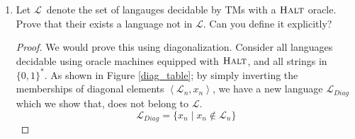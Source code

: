 \documentclass[usletter]{article}
\newcommand {\langset}[1]      {\ensuremath{\mathcal{#1}}}
\newcommand {\machine}[1]      {\ensuremath{\mathscr{#1}}}
\newcommand {\namedlangset}[1] {\ensuremath{\textnormal{\textsc{#1}}}}
\newcommand {\indpar}[1]   {
  \par\leftskip=#1em
  \noindent\ignorespaces
}
\newenvironment{turing}[2] {
  \smallskip
  \indpar{2}
  \textbf{Machine:} #1\\
  \textbf{Input:} $#2$\\[5pt]
  \textbf{begin}
  \parskip=0pt
  \indpar{3}
}{
  \indpar{2}
  \textbf{end}
  \par\medskip
}
\newcommand {\langL}          {\langset{L}}
\newcommand {\machineM}       {\machine{M}}
\begin{document}
\begin{enumerate}
\begin{proof}[Solution]
    By construction, the following observations are immediate:
    \begin{itemize}
      \item $\machine{H}^\alpha_x(k)$ \textit{always} halts; for all inputs $k$
            and regardless of $\alpha$ and $x$.
      \item If $\machineM_\alpha$ \textit{never} halts on $x$;
            then $\machine{H}^\alpha_x(k)$ runs in linear time, for all $k$.
      \item If $\machineM_\alpha$ eventually halts on $x$;
            then $\exists l_0 : \forall k : \machine{H}^\alpha_x(k)$ halts in
            at most $l_0$ steps.
    \end{itemize}

    Now, consider the following TM which should decide \namedlangset{Halt},
    assuming the existence of $\machineM_\namedlangset{Const}$ which decides if
    a TM (that always halts), runs in constant time:
    \begin{turing}{$\machineM_\namedlangset{Halt}$}{(\alpha, x)}
      construct the machine $\machine{H}^\alpha_x$ and encode it as $\beta$\\
      return the result of $\machineM_\namedlangset{Const}(\beta)$
    \end{turing}

    Thus, we have decided \namedlangset{Halt} assuming the decidability of
    \namedlangset{Const}. \\
    But we know \namedlangset{Halt} is undecidable.
    Therefore, \namedlangset{Const} \textit{must be} undecidable as well.
  \end{proof}

  \item Let \langL\ denote the set of langauges decidable by TMs with a
        \namedlangset{Halt} oracle.
        Prove that their exists a language not in \langL.
        Can you define it explicitly?
  \begin{proof}
    We would prove this using diagonalization. Consider all languages decidable
    using oracle machines equipped with \namedlangset{Halt}, and all strings in
    $\{0,1\}^*$. As shown in Figure \ref{diag_table}; by simply inverting the
    memberships of diagonal elements $\left< \langL_n,x_n \right>$, we have a
    new language $\langL_{Diag}$ which we show that, does not belong to \langL.
    \begin{equation}
      \label{L_Diag}
      \langL_{Diag} = \{ x_n \mid x_n \not\in \langL_n \}
    \end{equation}


\end{proof}
\end{enumerate}
\end{document}
